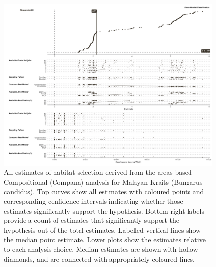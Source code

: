 \documentclass[10pt,a4paper]{article}
\begin{document}
\begin{figure}
\includegraphics[width=1\linewidth]{../../figures/specCurve_Malayan Krait_area} \caption{All estimates of habitat selection derived from the areas-based Compositional (Compana) analysis for Malayan Kraits (Bungarus candidus). Top curves show all estimates with coloured points and corresponding confidence intervals indicating whether those estimates significantly support the hypothesis. Bottom right labels provide a count of estimates that significantly support the hypothesis out of the total estimates. Labelled vertical lines show the median point estimate. Lower plots show the estimates relative to each analysis choice. Median estimates are shown with hollow diamonds, and are connected with appropriately coloured lines.}\label{fig:specCurveAreaBUCA}
\end{figure}
\end{document}
